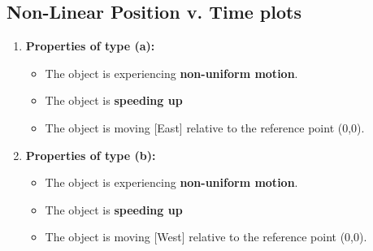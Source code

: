 \documentclass[12pt]{article}
\newcommand{\tx}[1]{\text{#1}}
\theoremstyle{break}
\begin{document}
\subsection{Non-Linear Position v. Time plots}
\begin{enumerate}[label = (\alph*)]
	\item 

		\textbf{\large{Properties of type (a):}}
		\begin{itemize}
			\item The object is experiencing \textbf{non-uniform motion}.
			\item The object is \textbf{speeding up}
			\item The object is moving [East] relative to the reference point (0,0).
		\end{itemize}


	\item 

		\textbf{\large{Properties of type (b):}}
		\begin{itemize}
			\item The object is experiencing \textbf{non-uniform motion}.
			\item The object is \textbf{speeding up}
			\item The object is moving [West] relative to the reference point (0,0).
		\end{itemize}



\end{enumerate}
\end{document}
